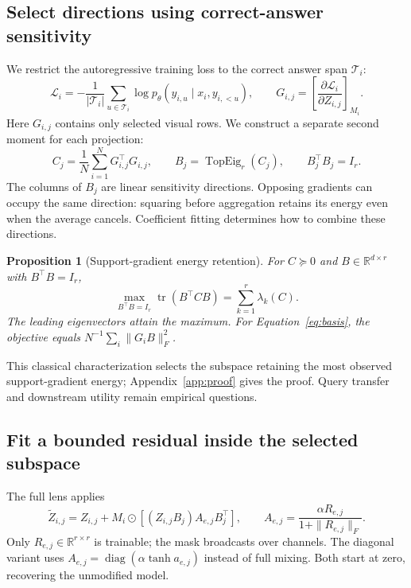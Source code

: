 \documentclass{article}
\newcommand{\R}{\mathbb{R}}
\newcommand{\tr}{\operatorname{tr}}
\newcommand{\diag}{\operatorname{diag}}
\newcommand{\TopEig}{\operatorname{TopEig}}
\newtheorem{proposition}{Proposition}
\begin{document}
\subsection{Select directions using correct-answer sensitivity}
\label{sec:basis}
We restrict the autoregressive training loss to the correct answer span $\mathcal T_i$:
\begin{equation}
 \mathcal L_i=-\frac{1}{|\mathcal T_i|}\sum_{u\in\mathcal T_i}
 \log p_\theta(y_{i,u}\mid x_i,y_{i,<u}),\qquad
 G_{i,j}=\left[\frac{\partial\mathcal L_i}{\partial Z_{i,j}}\right]_{M_i}.
 \label{eq:grad}
\end{equation}
Here $G_{i,j}$ contains only selected visual rows. We construct a separate second moment for each projection:
\begin{equation}
 C_j=\frac1N\sum_{i=1}^{N}G_{i,j}^{\top}G_{i,j},\qquad
 B_j=\TopEig_r(C_j),\qquad B_j^{\top}B_j=I_r.
 \label{eq:basis}
\end{equation}
The columns of $B_j$ are linear sensitivity directions. Opposing gradients can occupy the same direction: squaring before aggregation retains its energy even when the average cancels. Coefficient fitting determines how to combine these directions.

\begin{proposition}[Support-gradient energy retention]
For $C\succeq0$ and $B\in\R^{d\times r}$ with $B^\top B=I_r$,
\begin{equation}
 \max_{B^\top B=I_r}\tr(B^\top CB)=\sum_{k=1}^{r}\lambda_k(C).
 \label{eq:energy}
\end{equation}
The leading eigenvectors attain the maximum. For Equation~\ref{eq:basis}, the objective equals $N^{-1}\sum_i\|G_iB\|_F^2$.
\end{proposition}
This classical characterization selects the subspace retaining the most observed support-gradient energy; Appendix~\ref{app:proof} gives the proof. Query transfer and downstream utility remain empirical questions.

\subsection{Fit a bounded residual inside the selected subspace}
The full lens applies
\begin{equation}
 \widetilde Z_{i,j}=Z_{i,j}+M_i\odot\left[(Z_{i,j}B_j)A_{e,j}B_j^\top\right],
 \qquad A_{e,j}=\frac{\alpha R_{e,j}}{1+\|R_{e,j}\|_F}.
 \label{eq:lens}
\end{equation}
Only $R_{e,j}\in\R^{r\times r}$ is trainable; the mask broadcasts over channels. The diagonal variant uses $A_{e,j}=\diag(\alpha\tanh a_{e,j})$ instead of full mixing. Both start at zero, recovering the unmodified model.
\end{document}
